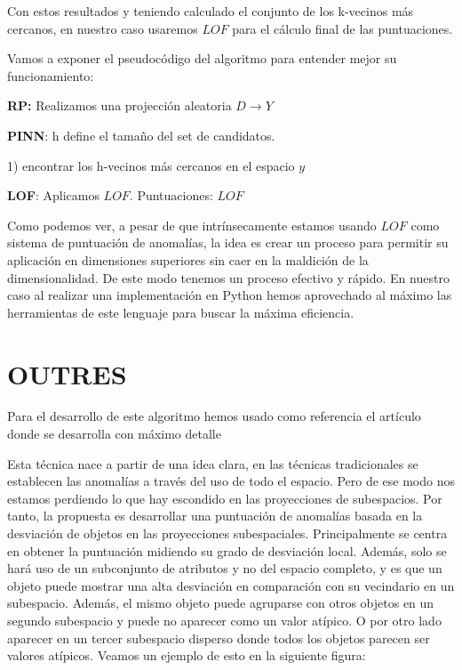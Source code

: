 Con estos resultados y teniendo calculado el conjunto de los k-vecinos
más cercanos, en nuestro caso usaremos $LOF$ para el cálculo final de
las puntuaciones.

Vamos a exponer el pseudocódigo del algoritmo para entender mejor su funcionamiento:

\begin{codigo}
    \begin{algorithmic}[1]
    \State \parbox[t]{305pt}{\textbf{RP:} Realizamos una projección aleatoria $D \rightarrow Y$}
    \State \textbf{PINN}: h define el tamaño del set de candidatos.
    
    \State \parbox[t]{305pt}{ 1) encontrar los h-vecinos más cercanos en el espacio $y$}
    \EndFor
    \State \textbf{LOF}: Aplicamos $LOF$.
    \State \Return Puntuaciones: $LOF$
    \EndFunction 
    \end{algorithmic}
\end{codigo}


Como podemos ver, a pesar de que intrínsecamente estamos usando $LOF$ como
sistema de puntuación de anomalías, la idea es crear un proceso para permitir
su aplicación en dimensiones superiores sin caer en la maldición de la
dimensionalidad. De este modo tenemos un proceso efectivo y rápido. En 
nuestro caso al realizar una implementación en Python hemos aprovechado 
al máximo las herramientas de este lenguaje para buscar la máxima eficiencia.

\section{OUTRES}
Para el desarrollo de este algoritmo hemos usado como referencia el
artículo donde se desarrolla con máximo detalle \cite{mullerAdaptiveOutliernessSubspace2010}

Esta técnica nace a partir de una idea clara, en las técnicas tradicionales
se establecen las anomalías a través del uso de todo el espacio. Pero de ese
modo nos estamos perdiendo lo que hay escondido en las proyecciones de subespacios.
Por tanto, la propuesta es desarrollar una puntuación de anomalías basada 
en la desviación de objetos en las proyecciones subespaciales. Principalmente
se centra en obtener la puntuación midiendo su grado de desviación local.
Además, solo se hará uso de un subconjunto de atributos y no del espacio
completo, y es que un objeto puede mostrar una alta desviación en 
comparación con su vecindario en un subespacio. Además, el mismo 
objeto puede agruparse con otros objetos en un segundo subespacio y 
puede no aparecer como un valor atípico. O por otro lado aparecer en 
un tercer subespacio disperso donde todos los objetos parecen ser 
valores atípicos. Veamos un ejemplo de esto en la siguiente figura:


